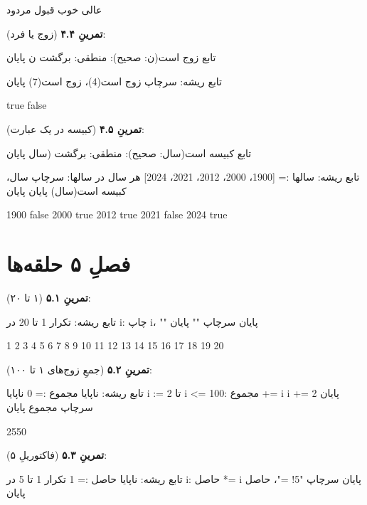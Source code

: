 \begin{progoutfa}
عالی خوب قبول مردود
\end{progoutfa}

\textbf{تمرینِ ۴.۴} (زوج یا فرد):
\begin{salamfa}
تابع زوج است(ن: صحیح): منطقی:
    برگشت ن %
پایان

تابع ریشه:
    سرچاپ زوج است(4)، زوج است(7)
پایان
\end{salamfa}

\begin{progoutfa}
true false
\end{progoutfa}

\textbf{تمرینِ ۴.۵} (کبیسه در یک عبارت):
\begin{salamfa}
تابع کبیسه است(سال: صحیح): منطقی:
    برگشت (سال %
پایان

تابع ریشه:
    سالها := [1900، 2000، 2012، 2021، 2024]
    هر سال در سالها:
        سرچاپ سال، کبیسه است(سال)
    پایان
پایان
\end{salamfa}

\begin{progoutfa}
1900 false
2000 true
2012 true
2021 false
2024 true
\end{progoutfa}

\section*{فصلِ ۵ حلقه‌ها}
{}

\textbf{تمرینِ ۵.۱} (۱ تا ۲۰):
\begin{salamfa}
تابع ریشه:
    تکرار 1 تا 20 در i:
        چاپ i، ""
    پایان
    سرچاپ ""
پایان
\end{salamfa}

\begin{progoutfa}
1 2 3 4 5 6 7 8 9 10 11 12 13 14 15 16 17 18 19 20
\end{progoutfa}

\textbf{تمرینِ ۵.۲} (جمعِ زوج‌های ۱ تا ۱۰۰):
\begin{salamfa}
تابع ریشه:
    ناپایا مجموع := 0
    ناپایا i := 2
    تا i <= 100:
        مجموع += i
        i += 2
    پایان
    سرچاپ مجموع
پایان
\end{salamfa}

\begin{progoutfa}
2550
\end{progoutfa}

\textbf{تمرینِ ۵.۳} (فاکتوریلِ ۵):
\begin{salamfa}
تابع ریشه:
    ناپایا حاصل := 1
    تکرار 1 تا 5 در i:
        حاصل *= i
    پایان
    سرچاپ "5! ="، حاصل
پایان
\end{salamfa}

